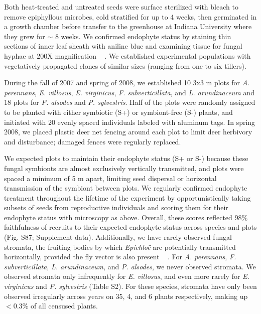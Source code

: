 \documentclass[lineno, sn-basic]{sn-jnl}%
\providecommand{\DIFadd}[1]{{\protect\color{blue}#1}} %
\providecommand{\DIFadd}[1]{{\protect\color{blue}\uwave{#1}}} %
\begin{document}
\DIFadd{Both heat-treated and untreated seeds were surface sterilized with bleach to remove epiphyllous microbes, cold stratified for up to 4 weeks, then germinated in a growth chamber before transfer to the greenhouse at Indiana University where they grew for $\sim$ 8 weeks. 
We confirmed endophyte status by staining thin sections of inner leaf sheath with aniline blue and examining tissue for fungal hyphae at 200X magnification \mbox{%
\citep{bacon2018stains}}\hspace{0pt}%
. 
We established experimental populations with vegetatively propagated clones of similar sizes (ranging from one to six tillers). 
}

\DIFadd{During the fall of 2007 and spring of 2008, we established 10 3x3 m plots for }\emph{\DIFadd{A. perennans}}\DIFadd{, }\emph{\DIFadd{E. villosus}}\DIFadd{, }\emph{\DIFadd{E. virginicus}}\DIFadd{, }\emph{\DIFadd{F. subverticillata}}\DIFadd{, and }\emph{\DIFadd{L. arundinaceum}}  \DIFadd{and 18 plots for }\emph{\DIFadd{P. alsodes}} \DIFadd{and }\emph{\DIFadd{P. sylvestris}}\DIFadd{.
Half of the plots were randomly assigned to be planted with either symbiotic (S+) or symbiont-free (S-) plants, and initiated with 20 evenly spaced individuals labeled with aluminum tags.
In spring 2008, we placed plastic deer net fencing around each plot to limit deer herbivory and disturbance; damaged fences were regularly replaced.
}


\DIFadd{We expected plots to maintain their endophyte status (S+ or S-) because these fungal symbionts are almost exclusively vertically transmitted, and plots were spaced a minimum of 5 m apart, limiting seed dispersal or horizontal transmission of the symbiont between plots. 
We regularly confirmed endophyte treatment throughout the lifetime of the experiment by opportunistically taking subsets of seeds from reproductive individuals and scoring them for their endophyte status with microscopy as above.
Overall, these scores reflected 98\% faithfulness of recruits to their expected endophyte status across species and plots (Fig. S87; Supplement data). 
Additionally, we have rarely observed fungal stromata, the fruiting bodies by which }\emph{\DIFadd{Epichlo\"e}} \DIFadd{are potentially transmitted horizontally, provided the fly vector is also present \mbox{%
\citep{bultman1995mutualistic}}\hspace{0pt}%
. 
For }\emph{\DIFadd{A. perennans}}\DIFadd{, }\emph{\DIFadd{F. subverticillata}}\DIFadd{, }\emph{\DIFadd{L. arundinaceum}}\DIFadd{, and }\emph{\DIFadd{P. alsodes}}\DIFadd{, we never observed stromata. 
We observed stromata only infrequently for }\emph{\DIFadd{E. villosus}}\DIFadd{, and even more rarely for }\emph{\DIFadd{E. virginicus}} \DIFadd{and }\emph{\DIFadd{P. sylvestris}} \DIFadd{(Table S2). 
For these species, stromata have only been observed irregularly across years on 35, 4, and 6 plants respectively, making up $< 0.3$\% of all censused plants.
}
\end{document}
